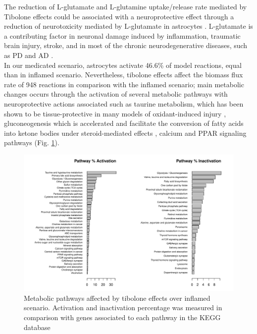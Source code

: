 The reduction of L-glutamate and L-glutamine uptake/release rate mediated by Tibolone effects could be associated with a neuroprotective effect through a reduction of neurotoxicity mediated by L-glutamate in astrocytes \cite{Petrelli2016}. L-glutamate is a contributing factor in neuronal damage induced by inflammation, traumatic brain injury, stroke, and in most of the chronic neurodegenerative diseases, such as PD and AD \cite{Ahlemeyer2002}.\\

In our medicated scenario, astrocytes activate 46.6\% of model reactions, equal than in inflamed scenario. Nevertheless, tibolone effects affect the biomass flux rate of 948 reactions in comparison with the inflamed scenario; main metabolic changes occurs through the activation of several metabolic pathways with neuroprotective actions associated such as taurine metabolism, which has been shown to be tissue-protective in many models of oxidant-induced injury \cite{Schuller-Levis2003}, gluconeogenesis which is accelerated and facilitate the conversion of fatty acids into ketone bodies under steroid-mediated effects \cite{Amen-Ra2006}, calcium and PPAR signaling pathways (Fig. \ref{I2T}).\\

\begin{figure}[h]
\begin{center}
\includegraphics[width=\textwidth]{neuroprotective/Inflammated2Tibolone}
\end{center}
\caption{Metabolic pathways affected by tibolone effects over inflamed scenario. Activation and inactivation percentage was measured in comparison with genes associated to each pathway in the KEGG database
}
\label{I2T}
\end{figure}

